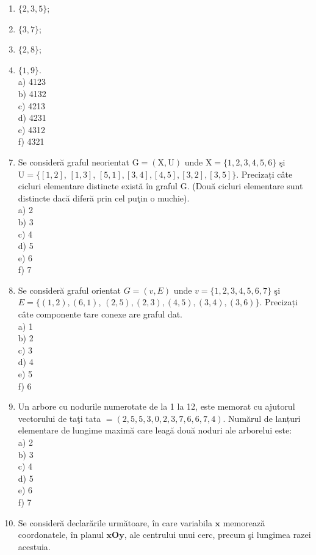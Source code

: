 \documentclass[10pt]{article}
\begin{document}
\begin{enumerate}
  \item $\{2,3,5\}$;
  \item $\{3,7\}$;
  \item $\{2,8\}$;
  \item $\{1,9\}$.\\
a) 4123\\
b) 4132\\
c) 4213\\
d) 4231\\
e) 4312\\
f) 4321
\end{enumerate}

\begin{enumerate}
  \setcounter{enumi}{6}
  \item Se consideră graful neorientat $\mathrm{G}=(\mathrm{X}, \mathrm{U})$ unde $\mathrm{X}=\{1,2,3,4,5,6\}$ şi $\mathrm{U}=\{[1,2]$, $[1,3]$, $[5,1],[3,4],[4,5],[3,2],[3,5]\}$. Precizați câte cicluri elementare distincte există în graful G. (Două cicluri elementare sunt distincte dacă diferă prin cel puţin o muchie).\\
a) 2\\
b) 3\\
c) 4\\
d) 5\\
e) 6\\
f) 7
  \item Se consideră graful orientat $G=(v, E)$ unde $v=\{1,2,3,4,5,6,7\}$ şi $E=\{(1,2),(6,1)$, $(2,5),(2,3),(4,5),(3,4),(3,6)\}$. Precizați câte componente tare conexe are graful dat.\\
a) 1\\
b) 2\\
c) 3\\
d) 4\\
e) 5\\
f) 6
  \item Un arbore cu nodurile numerotate de la 1 la 12, este memorat cu ajutorul vectorului de taţi tata $=(2,5,5,3,0,2,3,7,6,6,7,4)$. Numărul de lanțuri elementare de lungime maximă care leagă două noduri ale arborelui este:\\
a) 2\\
b) 3\\
c) 4\\
d) 5\\
e) 6\\
f) 7
  \item Se consideră declarările următoare, în care variabila $\mathbf{x}$ memorează coordonatele, în planul $\mathbf{x O y}$, ale centrului unui cerc, precum şi lungimea razei acestuia.
\end{enumerate}
\end{document}
